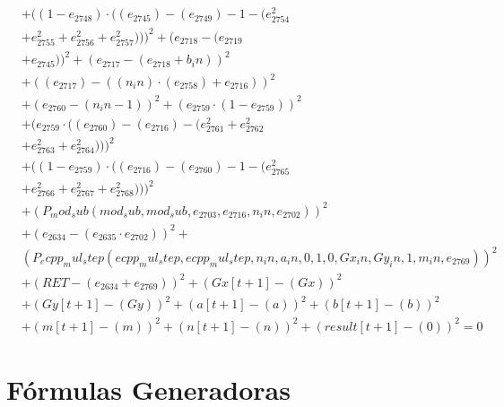 \documentclass[10pt, a4paper]{article}
\begin{document}
\begin{align*}
& + ((1 - e_{2748})  \cdot  ((e_{2745}) - (e_{2749}) - 1 - (e_{2754}^{2} \\
& + e_{2755}^{2} + e_{2756}^{2} + e_{2757}^{2})))^{2} + (e_{2718} - (e_{2719} \\
& + e_{2745}))^{2} + (e_{2717} - (e_{2718} + b_in))^{2} \\
& + ((e_{2717}) - ((n_in)  \cdot  (e_{2758}) + e_{2716}))^{2} \\
& + (e_{2760} - (n_in - 1))^{2} + (e_{2759}  \cdot  (1 - e_{2759}))^{2} \\
& + (e_{2759}  \cdot  ((e_{2760}) - (e_{2716}) - (e_{2761}^{2} + e_{2762}^{2} \\
& + e_{2763}^{2} + e_{2764}^{2})))^{2} \\
& + ((1 - e_{2759})  \cdot  ((e_{2716}) - (e_{2760}) - 1 - (e_{2765}^{2} \\
& + e_{2766}^{2} + e_{2767}^{2} + e_{2768}^{2})))^{2} \\
& + (P_mod_sub(mod_sub, mod_sub, e_{2703}, e_{2716}, n_in, e_{2702}))^{2} \\
& + (e_{2634} - (e_{2635}  \cdot  e_{2702}))^{2} + \\
& (P_ecpp_mul_step(ecpp_mul_step, ecpp_mul_step, n_in, a_in, 0, 1, 0, Gx_in, Gy_in, 1, m_in, e_{2769}))^{2} \\
& + (RET - (e_{2634} + e_{2769}))^{2} + (Gx[t+1] - (Gx))^{2} \\
& + (Gy[t+1] - (Gy))^{2} + (a[t+1] - (a))^{2} + (b[t+1] - (b))^{2} \\
& + (m[t+1] - (m))^{2} + (n[t+1] - (n))^{2} + (result[t+1] - (0))^{2} = 0
\end{align*}\part{Fórmulas Generadoras}
\end{document}

